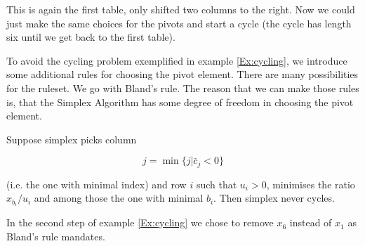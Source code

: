 \begin{Ex}[Cycling]
This is again the first table, only shifted two columns to the right. Now we could just make the same choices for the pivots and start a cycle (the cycle has length six until we get back to the first table).
\end{Ex}

To avoid the cycling problem exemplified in example \ref{Ex:cycling}, we introduce some additional rules for choosing the pivot element. There are many possibilities for the ruleset. We go with Bland's rule. The reason that we can make those rules is, that the Simplex Algorithm has some degree of freedom in choosing the pivot element. 

\begin{thm} Suppose simplex picks column 

\[j=\min \{j|\bar c_j < 0\}\]

(i.e. the one with minimal index) and row $i$ such that $u_i>0$, minimises the ratio $x_{b_i}/u_i$ and among those the one with minimal $b_i$. Then simplex never cycles.
\end{thm}

In the second step of example \ref{Ex:cycling} we chose to remove $x_6$ instead of $x_1$ as Bland's rule mandates.

